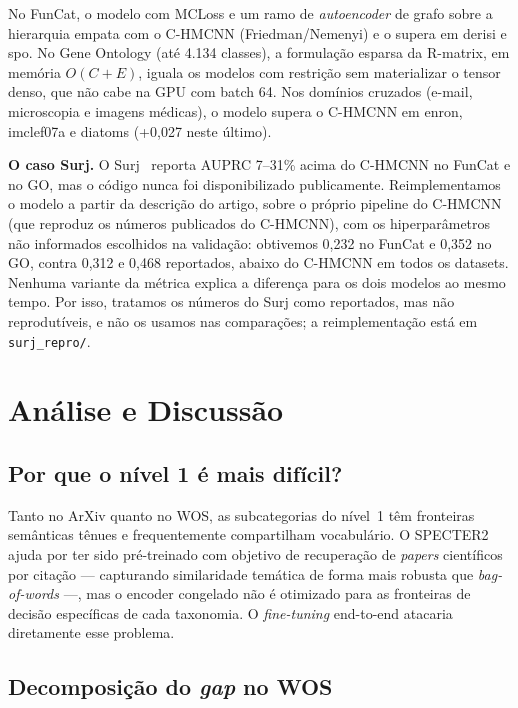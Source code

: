 \documentclass[11pt,a4paper,twoside]{article}
\begin{document}
No FunCat, o modelo com MCLoss e um ramo de \textit{autoencoder} de grafo
sobre a hierarquia empata com o C-HMCNN (Friedman/Nemenyi) e o supera em
derisi e spo.  No Gene Ontology (até 4.134 classes), a formulação esparsa
da R-matrix, em memória $O(C{+}E)$, iguala os modelos com restrição sem
materializar o tensor denso, que não cabe na GPU com batch 64.  Nos
domínios cruzados (e-mail, microscopia e imagens médicas), o modelo supera o
C-HMCNN em enron, imclef07a e diatoms (+0,027 neste último).

\textbf{O caso Surj.}  O Surj~\cite{yang2022surj} reporta AUPRC
7--31\% acima do C-HMCNN no FunCat e no GO, mas o código nunca foi
disponibilizado publicamente.  Reimplementamos o modelo a partir da
descrição do artigo, sobre o próprio pipeline do C-HMCNN (que reproduz os
números publicados do C-HMCNN), com os hiperparâmetros não informados
escolhidos na validação: obtivemos 0,232 no FunCat e 0,352 no GO, contra
0,312 e 0,468 reportados, abaixo do C-HMCNN em todos os datasets.  Nenhuma
variante da métrica explica a diferença para os dois modelos ao mesmo
tempo.  Por isso, tratamos os números do Surj como reportados, mas não
reprodutíveis, e não os usamos nas comparações; a reimplementação está em
\texttt{surj\_repro/}.

\section{Análise e Discussão}
\label{sec:discussion}

\subsection{Por que o nível 1 é mais difícil?}

Tanto no ArXiv quanto no WOS, as subcategorias do nível~1 têm fronteiras
semânticas tênues e frequentemente compartilham vocabulário. O
\textsc{SPECTER2} ajuda por ter sido pré-treinado com objetivo de recuperação
de \textit{papers} científicos por citação --- capturando similaridade temática
de forma mais robusta que \textit{bag-of-words} ---, mas o encoder congelado não
é otimizado para as fronteiras de decisão específicas de cada taxonomia. O
\textit{fine-tuning} end-to-end atacaria diretamente esse problema.

\subsection{Decomposição do \textit{gap} no WOS}
\end{document}
